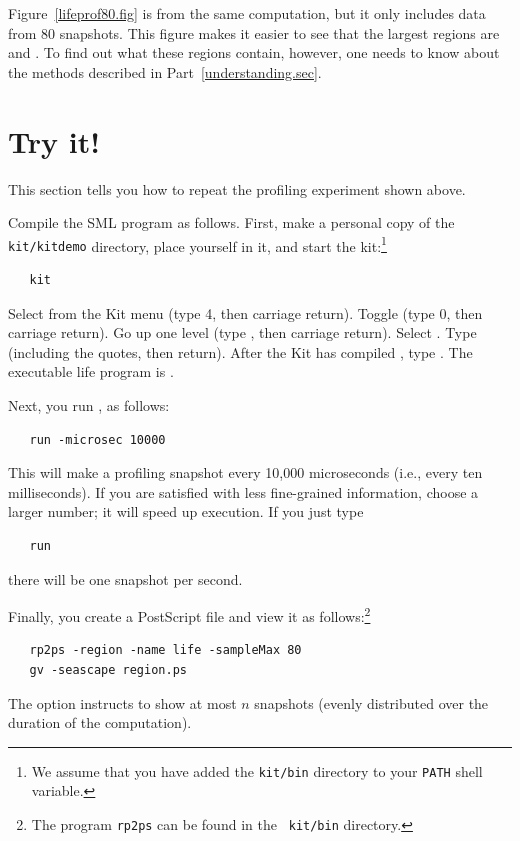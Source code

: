 \documentclass[12pt]{book}
\begin{document}
Figure~\ref{lifeprof80.fig} is from the same computation, but it only
includes data from 80 snapshots. This figure makes it easier to see
that the largest regions are  and . To
find out what these regions contain, however, one needs to know about
the methods described in Part~\ref{understanding.sec}.

\section{Try it!}
This section tells you how to repeat the profiling experiment shown
above.

Compile the SML program  as follows. First,
make a personal copy of the {\tt kit/kitdemo} directory, place
yourself in it, and start the kit:\footnote{We assume that you have added
  the {\tt kit/bin} directory to your {\tt PATH} shell variable.}
\begin{verbatim}
   kit
\end{verbatim}
Select  from the Kit menu (type 4, then carriage
return).  Toggle  (type 0, then carriage
return). Go up one level (type , then carriage return).
Select .  Type 
(including the quotes, then return). After the Kit has compiled
, type . The executable life program is
.

Next, you run , as follows:
\begin{verbatim}
   run -microsec 10000
\end{verbatim}
This will make a profiling snapshot every 10,000 microseconds (i.e.,
every ten milliseconds). If you are satisfied with less fine-grained
information, choose a larger number; it will speed up execution. If
you just type
\begin{verbatim}
   run 
\end{verbatim}
there will be one snapshot per second.

Finally, you create a PostScript file and view it as
follows:\footnote{The program {\tt rp2ps} can be found in the {\tt
    kit/bin} directory.}
%
\begin{verbatim}
   rp2ps -region -name life -sampleMax 80 
   gv -seascape region.ps
\end{verbatim}
The option  instructs  to show at
most $n$ snapshots (evenly distributed over the duration of the
computation).
\end{document}
